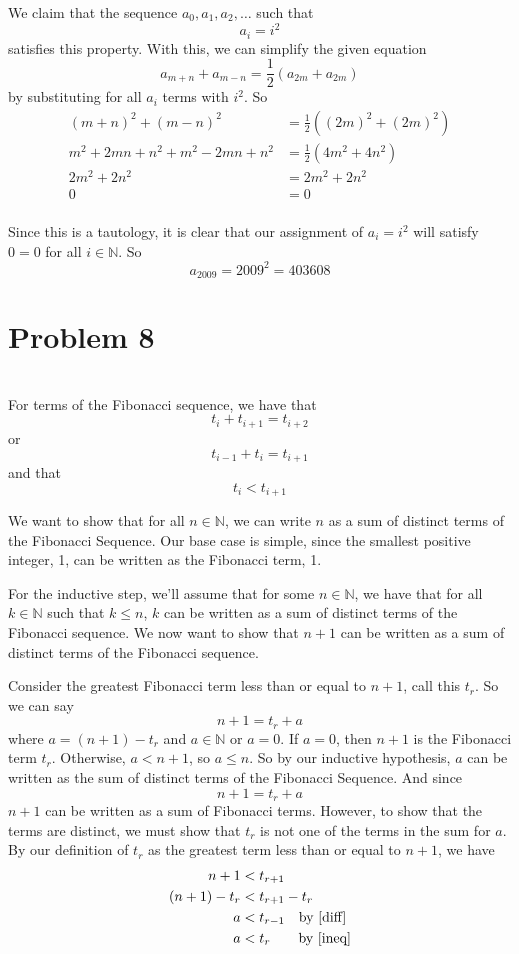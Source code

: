 \documentclass[12pt]{article}
\newcommand{\N}{\mathbb{N}}
\begin{document}
We claim that the sequence $a_0,a_1,a_2,\dots$ such that
\[a_i = i^2\]
satisfies this property. With this, we can simplify the given equation
\[a_{m+n}+a_{m-n} = \frac{1}{2}(a_{2m}+a_{2m})\]
by substituting for all $a_i$ terms with $i^2$. So
\begin{align*}
    (m+n)^2+(m-n)^2 &= \frac{1}{2}((2m)^2+(2m)^2) \\
    m^2 + 2mn + n^2 + m^2 - 2mn + n^2 &= \frac{1}{2}(4m^2+4n^2) \\
    2m^2 + 2n^2 &= 2m^2 + 2n^2 \\
    0 &= 0 \\
\end{align*}

Since this is a tautology, it is clear that our assignment of $a_i=i^2$ will satisfy $0=0$ for all $i\in\N$. So
\[a_{2009} = 2009^2 = 403608\]

\newpage
\section*{Problem 8}
\\

For terms of the Fibonacci sequence, we have that
\[t_i + t_{i+1} = t_{i+2}\]
or
\begin{equation}
    t_{i-1} + t_i = t_{i+1} \label{diff}
\end{equation}
and that
\begin{equation}
    t_i < t_{i+1} \label{ineq}
\end{equation}

We want to show that for all $n\in\N$, we can write $n$ as a sum of distinct terms of the Fibonacci Sequence. Our base case is simple, since the smallest positive integer, 1, can be written as the Fibonacci term, 1.

For the inductive step, we'll assume that for some $n\in\N$, we have that for all $k\in\N$ such that $k\leq n$, $k$ can be written as a sum of distinct terms of the Fibonacci sequence. We now want to show that $n+1$ can be written as a sum of distinct terms of the Fibonacci sequence.

Consider the greatest Fibonacci term less than or equal to $n+1$, call this $t_r$. So we can say
\[n+1 = t_r + a\]
where $a=(n+1)-t_r$ and $a\in\N$ or $a=0$. If $a=0$, then $n+1$ is the Fibonacci term $t_r$. Otherwise, $a < n+1$, so $a\leq n$. So by our inductive hypothesis, $a$ can be written as the sum of distinct terms of the Fibonacci Sequence. And since
\[n+1 = t_r + a\]
$n+1$ can be written as a sum of Fibonacci terms. However, to show that the terms are distinct, we must show that $t_r$ is not one of the terms in the sum for $a$. By our definition of $t_r$ as the greatest term less than or equal to $n+1$, we have
\begin{align*}
    n+1 &< t_{r+1} \\
    (n+1) - t_r &< t_{r+1} - t_r \\
    a &< t_{r-1} \quad \text{by \eqref{diff}}\\
    a &< t_r \qquad\text{by \eqref{ineq}}
\end{align*}
\end{document}
